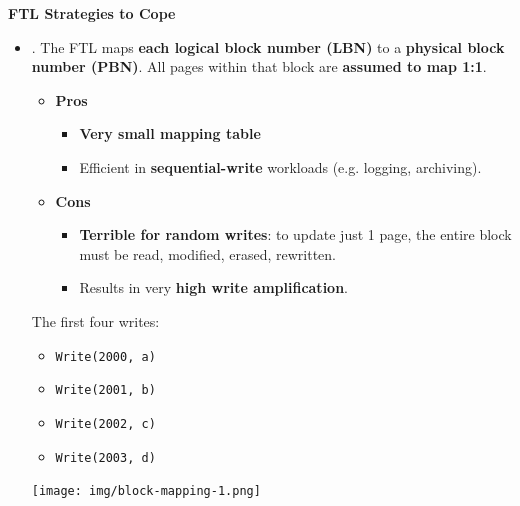 \begin{enumerate}
    \textcolor{Green3}{ \textbf{FTL Strategies to Cope}}
    \begin{itemize}
        \item {}. The FTL maps \textbf{each logical block number (LBN)} to a \textbf{physical block number (PBN)}. All pages within that block are \textbf{assumed to map 1:1}.
        \begin{itemize}
            \item[\textcolor{Green3}{\faIcon{check}}] \textcolor{Green3}{\textbf{Pros}}
            \begin{itemize}
                \item \textbf{Very small mapping table}
                \item Efficient in \textbf{sequential-write} workloads (e.g. logging, archiving).
            \end{itemize}
            \item[\textcolor{Red2}{\faIcon{times}}] \textcolor{Red2}{\textbf{Cons}}
            \begin{itemize}
                \item \textbf{Terrible for random writes}: to update just 1 page, the entire block must be read, modified, erased, rewritten.
                \item Results in very \textbf{high write amplification}.
            \end{itemize}
        \end{itemize}
        \begin{examplebox}
            The first four writes:
            \begin{multicols}{2}
                \begin{itemize}
                    \item \texttt{Write(2000, a)}
                    \item \texttt{Write(2001, b)}
                    \item \texttt{Write(2002, c)}
                    \item \texttt{Write(2003, d)}
                \end{itemize}
            \end{multicols}
            \begin{center}
                \texttt{[image: img/block-mapping-1.png]}
            \end{center}
    

\end{examplebox}
\end{itemize}
\end{enumerate}
